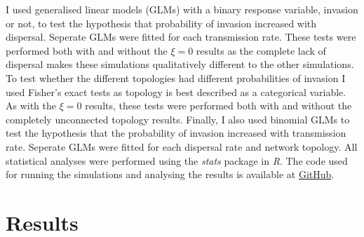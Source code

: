 I used generalised linear models (GLMs) with a binary response variable, invasion or not, to test the hypothesis that probability of invasion increased with dispersal.
Seperate GLMs were fitted for each transmission rate.
These tests were performed both with and without the $\xi = 0$ results as the complete lack of dispersal makes these simulations qualitatively different to the other simulations.
To test whether the different topologies had different probabilities of invasion I used Fisher's exact tests as topology is best described as a categorical variable.
As with the $\xi = 0$ results, these tests were performed both with and without the completely unconnected topology results.
Finally, I also used binomial GLMs to test the hypothesis that the probability of invasion increased with transmission rate.
Seperate GLMs were fitted for each dispersal rate and network topology.
All statistical analyses were performed using the \emph{stats} package in \emph{R}.
The code used for running the simulations and analysing the results is available at \href{https://github.com/timcdlucas/PhDThesis/blob/master/Chapter2.Rtex}{GitHub}.




\section{Results}












































